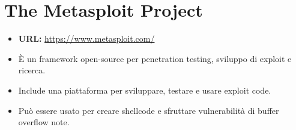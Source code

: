 \newpage
\section{The Metasploit Project}
\begin{itemize}
    \item \textbf{URL:} \url{https://www.metasploit.com/}
    \item È un framework open-source per penetration testing, sviluppo di exploit e ricerca.
    \item Include una piattaforma per sviluppare, testare e usare exploit code.
    \item Può essere usato per creare shellcode e sfruttare vulnerabilità di buffer overflow note.
\end{itemize}

